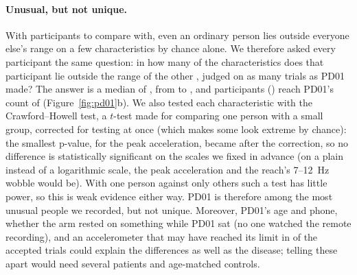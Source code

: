 \paragraph{Unusual, but not unique.} With  participants to compare with, even an ordinary person
lies outside everyone else's range on a few characteristics by chance alone. We therefore asked every participant the
same question: in how many of the  characteristics does that participant lie outside the range
of the other , judged on as many trials as PD01 made? The answer is a median of
, from  to , and
 participants () reach PD01's count of 
(Figure~\ref{fig:pd01}b). We also tested each characteristic with the Crawford--Howell test, a $t$-test made for
comparing one person with a small group, corrected for testing  at once (which makes some look
extreme by chance): the smallest p-value,  for the peak acceleration, became
 after the correction, so no difference is statistically significant on the scales we fixed in advance
(on a plain instead of a logarithmic scale, the peak acceleration and the reach's 7--12~Hz wobble would be). With one
person against only  others such a test has little power, so this is weak evidence either way.
PD01 is therefore among the most unusual people we recorded, but not unique. Moreover, PD01's age and phone, whether
the arm rested on something while PD01 sat (no one watched the remote recording), and an accelerometer that may have
reached its limit in  of the  accepted trials could explain the
differences as well as the disease; telling these apart would need several patients and age-matched controls.
